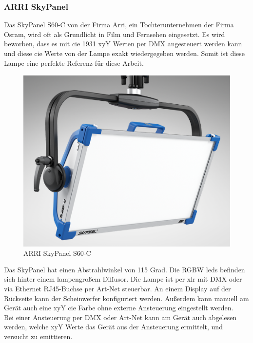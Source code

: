 \documentclass[11pt]{scrartcl}
\begin{document}
\subsubsection{ARRI SkyPanel}
Das SkyPanel S60-C von der Firma Arri, ein Tochterunternehmen der Firma Osram, wird oft als Grundlicht in Film und Fernsehen eingesetzt.
Es wird beworben, dass es mit \ac{cie} 1931 xyY Werten per DMX angesteuert werden kann und diese \ac{cie} Werte von der Lampe exakt
wiedergegeben werden. Somit ist diese Lampe eine perfekte Referenz für diese Arbeit.
\begin{figure}[H]
    \begin{center}
        \includegraphics[width=.48\textwidth]{images/skypanel_s60_c.png}
    \end{center}
    \caption[ARRI SkyPanel S60-C]{ARRI SkyPanel S60-C \cite{arri}}
\end{figure}
\noindent
Das SkyPanel hat einen Abstrahlwinkel von 115 Grad. Die RGBW \ac{led}s befinden sich hinter einem lampengroßem Diffusor. Die Lampe ist per
\ac{xlr} mit DMX oder via Ethernet RJ45-Buchse per Art-Net steuerbar. An einem Display auf der Rückseite kann der Scheinwerfer
konfiguriert werden. Außerdem kann manuell am Gerät auch eine xyY \ac{cie} Farbe ohne externe Ansteuerung eingestellt werden.\\
Bei einer Ansteuerung per DMX oder Art-Net kann am Gerät auch abgelesen werden, welche xyY Werte das Gerät aus der Ansteuerung ermittelt,
und versucht zu emittieren.
\end{document}
